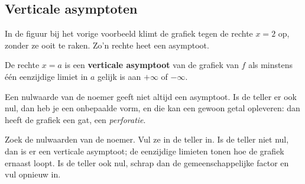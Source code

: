 \begin{oefeningen}
\end{oefeningen}

\subsection{Verticale asymptoten}

In de figuur bij het vorige voorbeeld klimt de grafiek tegen de rechte $x = 2$ op, zonder ze ooit te raken. Zo'n rechte heet een asymptoot.

\begin{theorie}
De rechte $x = a$ is een \textbf{\textcolor{accent}{verticale asymptoot}} van de grafiek van $f$ als minstens één eenzijdige limiet in $a$ gelijk is aan $+\infty$ of $-\infty$.
\end{theorie}

Een nulwaarde van de noemer geeft niet altijd een asymptoot. Is de teller er ook nul, dan heb je een onbepaalde vorm, en die kan een gewoon getal opleveren: dan heeft de grafiek een gat, een \textit{perforatie}.


\begin{werkwijze}
Zoek de nulwaarden van de noemer. Vul ze in de teller in. Is de teller niet nul, dan is er een verticale asymptoot; de eenzijdige limieten tonen hoe de grafiek ernaast loopt. Is de teller ook nul, schrap dan de gemeenschappelijke factor en vul opnieuw in.
\end{werkwijze}

